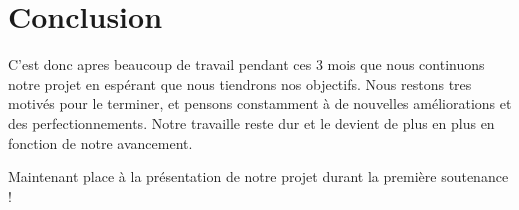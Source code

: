 \documentclass{article}
\begin{document}
\section{Conclusion}

\par
C'est donc apres beaucoup de travail  pendant ces 3 mois que nous continuons notre projet en espérant que nous tiendrons nos objectifs. Nous restons tres motivés pour le terminer, et pensons constamment à de nouvelles améliorations et des perfectionnements. Notre travaille reste dur et le devient de plus en plus en fonction de notre avancement.
\newline

\par
Maintenant place à la présentation de notre projet durant la première soutenance !
\end{document}
